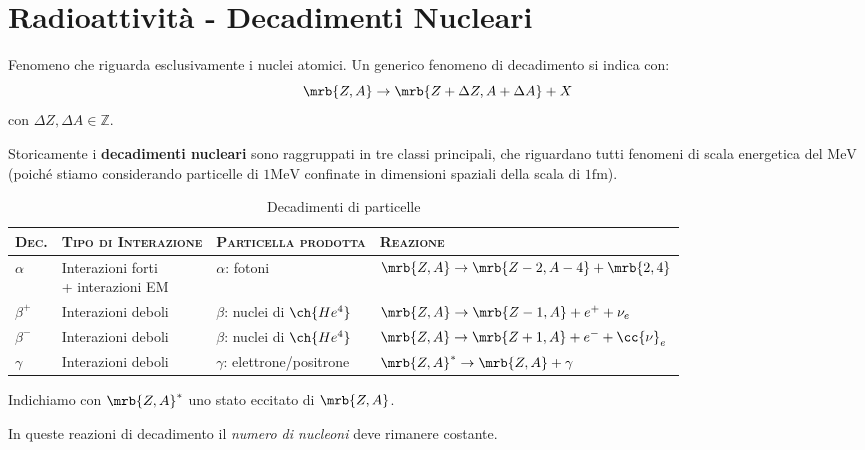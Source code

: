 \section{Radioattività - Decadimenti Nucleari}
Fenomeno che riguarda esclusivamente i nuclei atomici.
Un generico fenomeno di decadimento si indica con:
\begin{equation}
  \mrb{Z, A} \rightarrow \mrb{Z + \Delta Z, A + \Delta A} + X
\end{equation}
con $\Delta Z, \Delta A \in \mathbb{Z}$.

Storicamente i \textbf{decadimenti nucleari} sono raggruppati in tre classi
principali, che riguardano tutti fenomeni di scala energetica del $\si{\MeV}$
(poiché stiamo considerando particelle di $1\si{\MeV}$ confinate in dimensioni
spaziali della scala di $1\si{\femto\m}$).
\begin{table}[h!]
  \centering
  \caption{Decadimenti di particelle}
  \begin{tabular}{llll}
    \toprule
    \textsc{Dec.} & \textsc{Tipo di Interazione} & \textsc{Particella
    prodotta} & \textsc{Reazione}
    \\
    \midrule
    $\alpha$ &
    \makecell[l]{Interazioni forti\\+ interazioni EM} &
    $\alpha$: fotoni &
    $\mrb{Z, A} \rightarrow \mrb{Z-2, A-4} + \mrb{2,4}$
    \\
    $\beta^+$ &
    Interazioni deboli &
    $\beta$: nuclei di $\ch{He^4}$ &
    $\mrb{Z, A} \rightarrow \mrb{Z-1, A} + e^+ + \nu_e$
    \\
    $\beta^-$ &
    Interazioni deboli &
    $\beta$: nuclei di $\ch{He^4}$ &
    $\mrb{Z, A} \rightarrow \mrb{Z+1, A} + e^- + \cc{\nu}_{e}$
    \\
    $\gamma$ &
    Interazioni deboli &
    $\gamma$: elettrone/positrone &
    $\mrb{Z,A}^{\ast} \rightarrow \mrb{Z, A} + \gamma$
    \\
    \bottomrule
  \end{tabular}
\end{table}
Indichiamo con $\mrb{Z,A}^{\ast}$ uno stato eccitato di $\mrb{Z,A}$.

\begin{note}
  In queste reazioni di decadimento il \textit{numero di nucleoni} deve
  rimanere costante.
\end{note}

